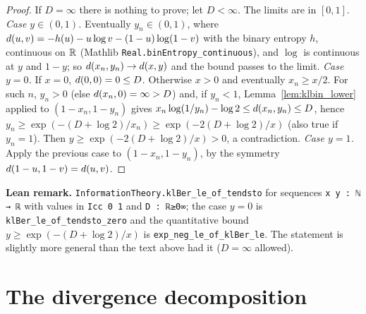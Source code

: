\begin{proof}
\leanok
If $D = \infty$ there is nothing to prove; let $D < \infty$. The limits are in $[0,1]$.
\emph{Case $y \in (0, 1)$.} Eventually $y_n \in (0,1)$, where
$d(u, v) = -h(u) - u\log v - (1-u)\log(1-v)$ with the binary entropy $h$, continuous on
$\mathbb{R}$ (Mathlib \texttt{Real.binEntropy\_continuous}), and $\log$ is continuous at $y$ and $1 - y$;
so $d(x_n, y_n) \to d(x, y)$ and the bound passes to the limit.
\emph{Case $y = 0$.} If $x = 0$, $d(0, 0) = 0 \le D$. Otherwise $x > 0$ and eventually
$x_n \ge x/2$. For such $n$, $y_n > 0$ (else $d(x_n, 0) = \infty > D$) and, if $y_n < 1$,
Lemma~\ref{lem:klbin_lower} applied to $(1 - x_n, 1 - y_n)$ gives
$x_n\log(1/y_n) - \log 2 \le d(x_n, y_n) \le D$, hence
$y_n \ge \exp(-(D + \log 2)/x_n) \ge \exp(-2(D + \log 2)/x)$ (also true if $y_n = 1$). Then
$y \ge \exp(-2(D + \log 2)/x) > 0$, a contradiction.
\emph{Case $y = 1$.} Apply the previous case to $(1 - x_n, 1 - y_n)$, by the symmetry
$d(1-u, 1-v) = d(u, v)$.
\end{proof}

\textbf{Lean remark.} \texttt{InformationTheory.klBer\_le\_of\_tendsto} for sequences
\texttt{x y : ℕ → ℝ} with values in \texttt{Icc 0 1} and \texttt{D : ℝ≥0∞}; the case $y = 0$ is
\texttt{klBer\_le\_of\_tendsto\_zero} and the quantitative bound
$y \ge \exp(-(D + \log 2)/x)$ is \texttt{exp\_neg\_le\_of\_klBer\_le}. The statement is slightly
more general than the text above had it ($D = \infty$ allowed).

\section{The divergence decomposition}
\label{sec:pinfo_decomposition}

